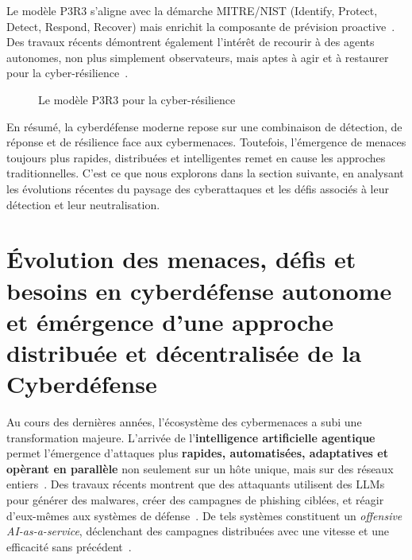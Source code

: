 \documentclass[ twoside,openright,titlepage,numbers=noenddot,headinclude,%
                footinclude=true,cleardoublepage=empty,abstractoff, %
                BCOR=5mm,paper=a4,fontsize=11pt,%
                french,american,%
                ]{scrreprt}
\begin{document}
Le modèle P3R3 s'aligne avec la démarche MITRE/NIST (Identify, Protect, Detect, Respond, Recover) mais enrichit la composante de prévision proactive~\cite{Theron2013P3R3}.
Des travaux récents démontrent également l'intérêt de recourir à des agents autonomes, non plus simplement observateurs, mais aptes à agir et à restaurer pour la cyber-résilience~\cite{Kott2023}.

\begin{figure}[h]
  \centering
  \caption{Le modèle P3R3 pour la cyber-résilience}
  \label{fig:P3R3_model}
\end{figure}

\noindent
En résumé, la cyberdéfense moderne repose sur une combinaison de détection, de réponse et de résilience face aux cybermenaces. Toutefois, l'émergence de menaces toujours plus rapides, distribuées et intelligentes remet en cause les approches traditionnelles. C'est ce que nous explorons dans la section suivante, en analysant les évolutions récentes du paysage des cyberattaques et les défis associés à leur détection et leur neutralisation.


\section{Évolution des menaces, défis et besoins en cyberdéfense autonome et émérgence d'une approche distribuée et décentralisée de la Cyberdéfense}\label{sec:evolution-menaces}


Au cours des dernières années, l'écosystème des cybermenaces a subi une transformation majeure. L'arrivée de l'\textbf{intelligence artificielle agentique} permet l'émergence d'attaques plus \textbf{rapides, automatisées, adaptatives et opèrant en parallèle} non seulement sur un hôte unique, mais sur des réseaux entiers~\cite{Cohen2020}. Des travaux récents montrent que des attaquants utilisent des LLMs pour générer des malwares, créer des campagnes de phishing ciblées, et réagir d'eux-mêmes aux systèmes de défense~\cite{AutoAttacker2024}. De tels systèmes constituent un {\em offensive AI-as-a-service}, déclenchant des campagnes distribuées avec une vitesse et une efficacité sans précédent~\cite{AgenticAIThreats2025}.
\end{document}
